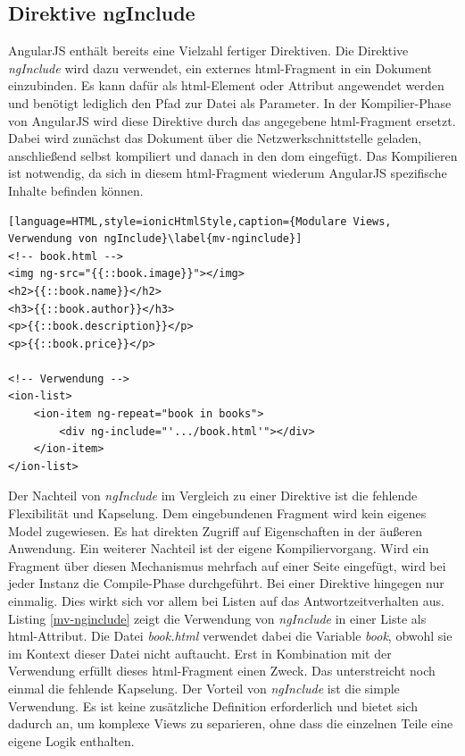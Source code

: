 \subsection{Direktive ngInclude}
AngularJS enthält bereits eine Vielzahl fertiger Direktiven. Die Direktive \emph{ngInclude} wird dazu verwendet, ein externes \gls{html}-Fragment in ein Dokument einzubinden. Es kann dafür als \gls{html}-Element oder Attribut angewendet werden und benötigt lediglich den Pfad zur Datei als Parameter. In der Kompilier-Phase von AngularJS wird diese Direktive durch das angegebene \gls{html}-Fragment ersetzt. Dabei wird zunächst das Dokument über die Netzwerkschnittstelle geladen, anschließend selbst kompiliert und danach in den \gls{dom} eingefügt. Das Kompilieren ist notwendig, da sich in diesem \gls{html}-Fragment wiederum AngularJS spezifische Inhalte befinden können. 
\begin{lstlisting}[language=HTML,style=ionicHtmlStyle,caption={Modulare Views, Verwendung von ngInclude}\label{mv-nginclude}]
<!-- book.html -->
<img ng-src="{{::book.image}}"></img>
<h2>{{::book.name}}</h2>
<h3>{{::book.author}}</h3>
<p>{{::book.description}}</p>
<p>{{::book.price}}</p>

<!-- Verwendung -->
<ion-list>
	<ion-item ng-repeat="book in books">
		<div ng-include="'.../book.html'"></div>
	</ion-item>
</ion-list>
\end{lstlisting}
Der Nachteil von \emph{ngInclude} im Vergleich zu einer Direktive ist die fehlende Flexibilität und Kapselung. Dem eingebundenen Fragment wird kein eigenes Model zugewiesen. Es hat direkten Zugriff auf Eigenschaften in der äußeren Anwendung. Ein weiterer Nachteil ist der eigene Kompiliervorgang. Wird ein Fragment über diesen Mechanismus mehrfach auf einer Seite eingefügt, wird bei jeder Instanz die Compile-Phase durchgeführt. Bei einer Direktive hingegen nur einmalig. Dies wirkt sich vor allem bei Listen auf das Antwortzeitverhalten aus. Listing \ref{mv-nginclude} zeigt die Verwendung von \emph{ngInclude} in einer Liste als \gls{html}-Attribut. Die Datei \emph{book.html} verwendet dabei die Variable \emph{book}, obwohl sie im Kontext dieser Datei nicht auftaucht. Erst in Kombination mit der Verwendung erfüllt dieses \gls{html}-Fragment einen Zweck. Das unterstreicht noch einmal die fehlende Kapselung. Der Vorteil von \emph{ngInclude} ist die simple Verwendung. Es ist keine zusätzliche Definition erforderlich und bietet sich dadurch an, um komplexe Views zu separieren, ohne dass die einzelnen Teile eine eigene Logik enthalten.\cite{AJSNGInclude}

